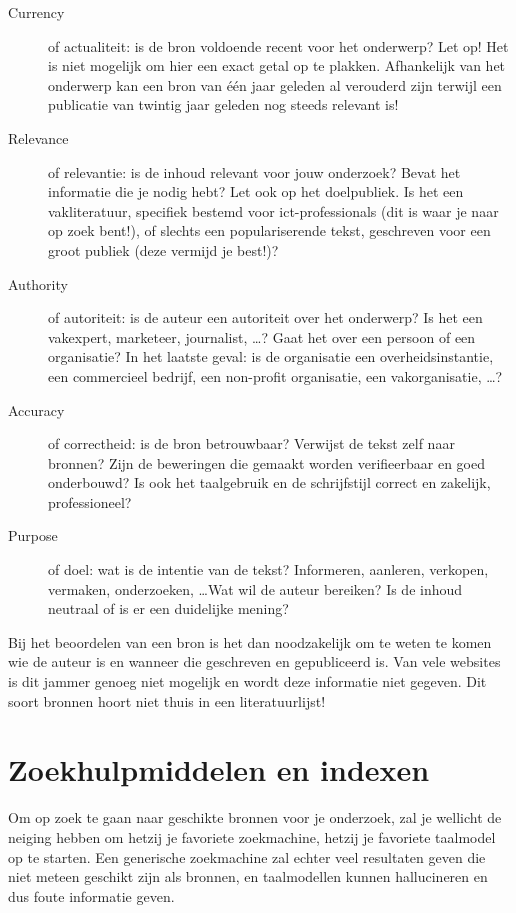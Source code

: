 \begin{description}
  \item[Currency] of actualiteit: is de bron voldoende recent voor het onderwerp? Let op! Het is niet mogelijk om hier een exact getal op te plakken. Afhankelijk van het onderwerp kan een bron van één jaar geleden al verouderd zijn terwijl een publicatie van twintig jaar geleden nog steeds relevant is!

  \item[Relevance] of relevantie: is de inhoud relevant voor jouw onderzoek? Bevat het informatie die je nodig hebt? Let ook op het doelpubliek. Is het een vakliteratuur, specifiek bestemd voor ict-professionals (dit is waar je naar op zoek bent!), of slechts een populariserende tekst, geschreven voor een groot publiek (deze vermijd je best!)?

  \item[Authority] of autoriteit: is de auteur een autoriteit over het onderwerp? Is het een vakexpert, marketeer, journalist, \ldots? Gaat het over een persoon of een organisatie? In het laatste geval: is de organisatie een overheidsinstantie, een commercieel bedrijf, een non-profit organisatie, een vakorganisatie, \ldots?

  \item[Accuracy] of correctheid: is de bron betrouwbaar? Verwijst de tekst zelf naar bronnen? Zijn de beweringen die gemaakt worden verifieerbaar en goed onderbouwd? Is ook het taalgebruik en de schrijfstijl correct en zakelijk, professioneel?

  \item[Purpose] of doel: wat is de intentie van de tekst? Informeren, aanleren, verkopen, vermaken, onderzoeken, \ldots Wat wil de auteur bereiken? Is de inhoud neutraal of is er een duidelijke mening?
\end{description}

Bij het beoordelen van een bron is het dan noodzakelijk om te weten te komen wie de auteur is en wanneer die geschreven en gepubliceerd is. Van vele websites is dit jammer genoeg niet mogelijk en wordt deze informatie niet gegeven. Dit soort bronnen hoort niet thuis in een literatuurlijst!

\section{Zoekhulpmiddelen en indexen}%
\label{sec:zoekhulpmiddelen-en-indexen}

Om op zoek te gaan naar geschikte bronnen voor je onderzoek, zal je wellicht de neiging hebben om hetzij je favoriete zoekmachine, hetzij je favoriete taalmodel op te starten. Een generische zoekmachine zal echter veel resultaten geven die niet meteen geschikt zijn als bronnen, en taalmodellen kunnen hallucineren en dus foute informatie geven.

